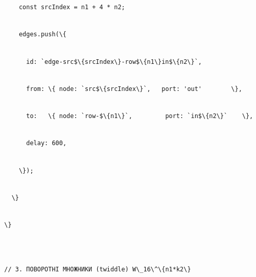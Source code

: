 \documentclass[
]{article}
\newcommand{\passthrough}[1]{#1}
\begin{document}
\passthrough{\lstinline!      !}\passthrough{\lstinline!const!}\passthrough{\lstinline! !}\passthrough{\lstinline!srcIndex!}\passthrough{\lstinline! !}\passthrough{\lstinline!=!}\passthrough{\lstinline! !}\passthrough{\lstinline!n1!}\passthrough{\lstinline! !}\passthrough{\lstinline!+!}\passthrough{\lstinline! !}\passthrough{\lstinline!4!}\passthrough{\lstinline! !}\passthrough{\lstinline!*!}\passthrough{\lstinline! !}\passthrough{\lstinline!n2;!}\strut \\
\passthrough{\lstinline!      !}\passthrough{\lstinline!edges.push!}\passthrough{\lstinline!(\{!}\strut \\
\passthrough{\lstinline!        !}\passthrough{\lstinline!id:!}\passthrough{\lstinline! !}\passthrough{\lstinline!`edge-!}\passthrough{\lstinline!src!}\passthrough{\lstinline!$\{!}\passthrough{\lstinline!srcIndex!}\passthrough{\lstinline!\}-row$\{n1\}in$\{n2\}`,!}\strut \\
\passthrough{\lstinline!        !}\passthrough{\lstinline!from:!}\passthrough{\lstinline! !}\passthrough{\lstinline!\{!}\passthrough{\lstinline! !}\passthrough{\lstinline!node:!}\passthrough{\lstinline! !}\passthrough{\lstinline!`!}\passthrough{\lstinline!src!}\passthrough{\lstinline!$\{!}\passthrough{\lstinline!srcIndex!}\passthrough{\lstinline!\}`,!}\passthrough{\lstinline!   !}\passthrough{\lstinline!port:!}\passthrough{\lstinline! !}\passthrough{\lstinline!'out'!}\passthrough{\lstinline!        !}\passthrough{\lstinline!\},!}\strut \\
\passthrough{\lstinline!        !}\passthrough{\lstinline!to:!}\passthrough{\lstinline!   !}\passthrough{\lstinline!\{!}\passthrough{\lstinline! !}\passthrough{\lstinline!node:!}\passthrough{\lstinline! !}\passthrough{\lstinline!`row-$\{n1\}`,!}\passthrough{\lstinline!         !}\passthrough{\lstinline!port:!}\passthrough{\lstinline! !}\passthrough{\lstinline!`in$\{n2\}`!}\passthrough{\lstinline!    !}\passthrough{\lstinline!\},!}\strut \\
\passthrough{\lstinline!        !}\passthrough{\lstinline!delay:!}\passthrough{\lstinline! !}\passthrough{\lstinline!600,!}\strut \\
\passthrough{\lstinline!      !}\passthrough{\lstinline!\});!}\strut \\
\passthrough{\lstinline!    !}\passthrough{\lstinline!\}!}\strut \\
\passthrough{\lstinline!  !}\passthrough{\lstinline!\}!}\strut \\
\strut \\
\passthrough{\lstinline!  !}\passthrough{\lstinline!//!}\passthrough{\lstinline! !}\passthrough{\lstinline!3.!}\passthrough{\lstinline! !}\passthrough{\lstinline!ПОВОРОТНІ!}\passthrough{\lstinline! !}\passthrough{\lstinline!МНОЖНИКИ!}\passthrough{\lstinline! !}\passthrough{\lstinline!(twiddle)!}\passthrough{\lstinline! !}\passthrough{\lstinline!W\_16\^\{n1*k2\}!}\strut \\
\end{document}
